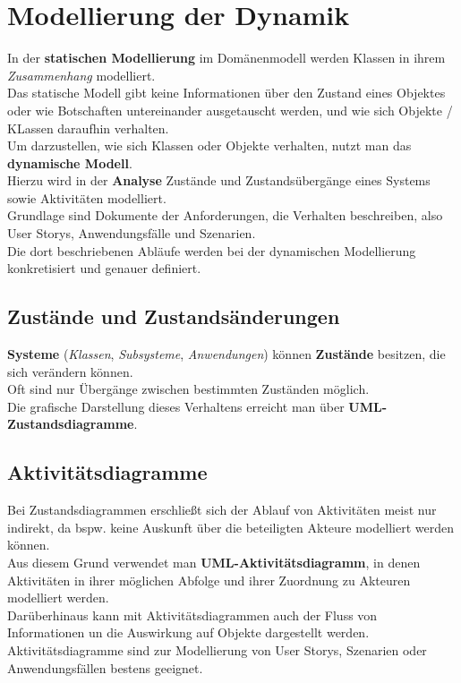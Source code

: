 \section{Modellierung der Dynamik}

\noindent
In der \textbf{statischen Modellierung} im Domänenmodell werden Klassen in ihrem \textit{Zusammenhang} modelliert.\\

\noindent
Das statische Modell gibt keine Informationen über den Zustand eines Objektes oder wie Botschaften untereinander ausgetauscht werden, und wie sich Objekte / KLassen daraufhin verhalten.\\

\noindent
Um darzustellen, wie sich Klassen oder Objekte verhalten, nutzt man das \textbf{dynamische Modell}.\\

\noindent
Hierzu wird in der \textbf{Analyse} Zustände und Zustandsübergänge eines Systems sowie Aktivitäten modelliert.\\
Grundlage sind Dokumente der Anforderungen, die Verhalten beschreiben, also User Storys, Anwendungsfälle und Szenarien.\\
Die dort beschriebenen Abläufe werden bei der dynamischen Modellierung konkretisiert und genauer definiert.

\subsection*{Zustände und Zustandsänderungen}
\textbf{Systeme} (\textit{Klassen}, \textit{Subsysteme}, \textit{Anwendungen}) können \textbf{Zustände} besitzen, die sich verändern können.\\

\noindent
Oft sind nur Übergänge zwischen bestimmten Zuständen möglich.\\

\noindent
Die grafische Darstellung dieses Verhaltens erreicht man über \textbf{UML-Zustandsdiagramme}.

\subsection*{Aktivitätsdiagramme}
Bei Zustandsdiagrammen erschließt sich der Ablauf von Aktivitäten meist nur indirekt, da bspw. keine Auskunft über die beteiligten Akteure modelliert werden können.\\

\noindent
Aus diesem Grund verwendet man \textbf{UML-Aktivitätsdiagramm}, in denen Aktivitäten in ihrer möglichen Abfolge und ihrer Zuordnung zu Akteuren modelliert werden.\\

\noindent
Darüberhinaus kann mit Aktivitätsdiagrammen  auch der Fluss von Informationen un die Auswirkung auf Objekte dargestellt werden.\\

\noindent
Aktivitätsdiagramme sind zur Modellierung von User Storys, Szenarien oder Anwendungsfällen bestens geeignet.